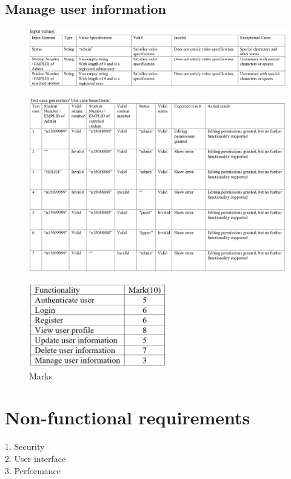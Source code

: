 \documentclass[english]{article}
\begin{document}
\subsection{Manage user information}
\begin{figure}[ht!]
\hspace*{-2.5cm} 
\includegraphics[width=180mm]{13.png}
\end{figure}
\begin{figure}[ht!]
\hspace*{-2.5cm} 
\includegraphics[width=180mm]{14.png}
\end{figure}
\clearpage
\begin{figure}[ht!]
\center
\includegraphics[width=60mm]{Marks.png}
\caption{Marks}
\end{figure}
\section{Non-functional requirements}
1.	Security\\
2.	User interface\\
3.	Performance\\
\end{document}
